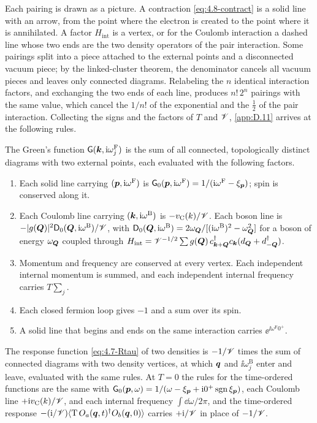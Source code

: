 Each pairing is drawn as a picture. A contraction \cref{eq:4.8-contract} is a solid line with an arrow, from the point where the electron is created to the point where it is annihilated. A factor $H_{\mathrm{int}}$ is a vertex, or for the Coulomb interaction a dashed line whose two ends are the two density operators of the pair interaction. Some pairings split into a piece attached to the external points and a disconnected vacuum piece; by the linked-cluster theorem, the denominator cancels all vacuum pieces and leaves only connected diagrams. Relabeling the $n$ identical interaction factors, and exchanging the two ends of each line, produces $n!\,2^n$ pairings with the same value, which cancel the $1/n!$ of the exponential and the $\tfrac12$ of the pair interaction. Collecting the signs and the factors of $T$ and $\mathscr{V}$, \cref{app:D.11} arrives at the following rules.
\begin{keyresult}
The Green's function $\mathsf{G}(\bm{k},\mathrm{i}\omega^{\mathrm{F}}_j)$ is the sum of all connected, topologically distinct diagrams with two external points, each evaluated with the following factors.
\begin{enumerate}
  \item Each solid line carrying $(\bm{p},\mathrm{i}\omega^{\mathrm{F}})$ is $\mathsf{G}_0(\bm{p},\mathrm{i}\omega^{\mathrm{F}}) = 1/(\mathrm{i}\omega^{\mathrm{F}} - \xi_{\bm{p}})$; spin is conserved along it.
  \item Each Coulomb line carrying $(\bm{k},\mathrm{i}\omega^{\mathrm{B}})$ is $-v_{\mathrm{C}}(k)/\mathscr{V}$. Each boson line is $-|g(\bm{Q})|^2\mathsf{D}_0(\bm{Q},\mathrm{i}\omega^{\mathrm{B}})/\mathscr{V}$, with $\mathsf{D}_0(\bm{Q},\mathrm{i}\omega^{\mathrm{B}}) = 2\omega_{\bm{Q}}/[(\mathrm{i}\omega^{\mathrm{B}})^2 - \omega_{\bm{Q}}^2]$ for a boson of energy $\omega_{\bm{Q}}$ coupled through $H_{\mathrm{int}} = \mathscr{V}^{-1/2}\sum g(\bm{Q})\,c^\dagger_{\bm{k}+\bm{Q}}c_{\bm{k}}(d_{\bm{Q}} + d^\dagger_{-\bm{Q}})$.
  \item Momentum and frequency are conserved at every vertex. Each independent internal momentum is summed, and each independent internal frequency carries $T\sum_j$.
  \item Each closed fermion loop gives $-1$ and a sum over its spin.
  \item A solid line that begins and ends on the same interaction carries $\ee^{\ii\omega^{\mathrm{F}}0^+}$.
\end{enumerate}
The response function \cref{eq:4.7-Rtau} of two densities is $-1/\mathscr{V}$ times the sum of connected diagrams with two density vertices, at which $\bm{q}$ and $\ii\omega^{\mathrm{B}}_j$ enter and leave, evaluated with the same rules. At $T = 0$ the rules for the time-ordered functions are the same with $\mathsf{G}_0(\bm{p},\omega) = 1/(\omega - \xi_{\bm{p}} + \mathrm{i}0^+\operatorname{sgn}\xi_{\bm{p}})$, each Coulomb line $+\mathrm{i} v_{\mathrm{C}}(k)/\mathscr{V}$, and each internal frequency $\int\dd\omega/2\pi$, and the time-ordered response $-(\mathrm{i}/\mathscr{V})\langle\mathrm{T}\,O_a(\bm{q},t)^\dagger O_b(\bm{q},0)\rangle$ carries $+\mathrm{i}/\mathscr{V}$ in place of $-1/\mathscr{V}$.
\end{keyresult}
